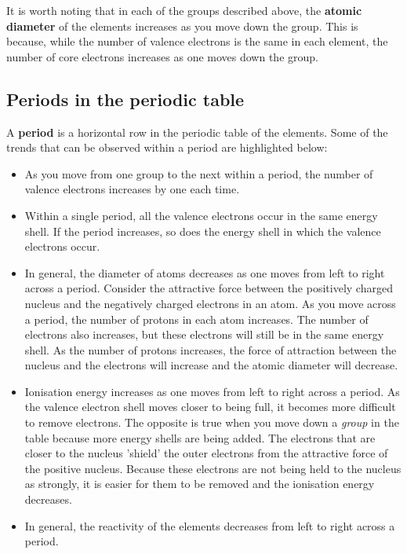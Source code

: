 It is worth noting that in each of the groups described above, the \textbf{atomic diameter} of the elements increases as you move down the group. This is because, while the number of valence electrons is the same in each element, the number of core electrons increases as one moves down the group.

\subsection{Periods in the periodic table}

A \textbf{period} is a horizontal row in the periodic table of the elements. Some of the trends that can be observed within a period are highlighted below:

\begin{itemize}
\item{As you move from one group to the next within a period, the number of valence electrons increases by one each time.}
\item{Within a single period, all the valence electrons occur in the same energy shell. If the period increases, so does the energy shell in which the valence electrons occur.}
\item{In general, the diameter of atoms decreases as one moves from left to right across a period. Consider the attractive force between the positively charged nucleus and the negatively charged electrons in an atom. As you move across a period, the number of protons in each atom increases. The number of electrons also increases, but these electrons will still be in the same energy shell. As the number of protons increases, the force of attraction between the nucleus and the electrons will increase and the atomic diameter will decrease.}
\item{Ionisation energy increases as one moves from left to right across a period. As the valence electron shell moves closer to being full, it becomes more difficult to remove electrons. The opposite is true when you move down a \textit{group} in the table because more energy shells are being added. The electrons that are closer to the nucleus 'shield' the outer electrons from the attractive force of the positive nucleus. Because these electrons are not being held to the nucleus as strongly, it is easier for them to be removed and the ionisation energy decreases.}
\item{In general, the reactivity of the elements decreases from left to right across a period.}
\end{itemize}


